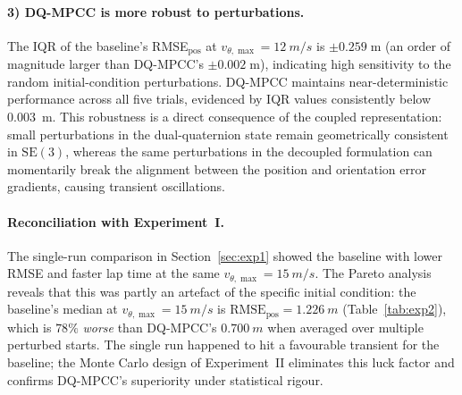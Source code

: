 \paragraph{3) DQ-MPCC is more robust to perturbations.}
The IQR of the baseline's RMSE$_{\text{pos}}$ at
$v_{\theta,\max} = \SI{12}{m/s}$ is $\pm 0.259\;\text{m}$
(an order of magnitude larger than DQ-MPCC's $\pm 0.002\;\text{m}$),
indicating high sensitivity to the random initial-condition
perturbations.
DQ-MPCC maintains near-deterministic performance across all
five trials, evidenced by IQR values consistently below
\SI{0.003}{m}.
This robustness is a direct consequence of the coupled
representation: small perturbations in the dual-quaternion
state remain geometrically consistent in $\mathrm{SE}(3)$,
whereas the same perturbations in the decoupled formulation
can momentarily break the alignment between the position
and orientation error gradients, causing transient oscillations.

\paragraph{Reconciliation with Experiment~I.}
The single-run comparison in Section~\ref{sec:exp1} showed
the baseline with lower RMSE and faster lap time at the same
$v_{\theta,\max} = \SI{15}{m/s}$.
The Pareto analysis reveals that this was partly an artefact
of the specific initial condition: the baseline's median at
$v_{\theta,\max} = \SI{15}{m/s}$ is $\text{RMSE}_{\text{pos}}
= \SI{1.226}{m}$ (Table~\ref{tab:exp2}), which is $78\%$
\emph{worse} than DQ-MPCC's $\SI{0.700}{m}$ when averaged
over multiple perturbed starts.
The single run happened to hit a favourable transient for
the baseline; the Monte Carlo design of Experiment~II
eliminates this luck factor and confirms DQ-MPCC's
superiority under statistical rigour.
